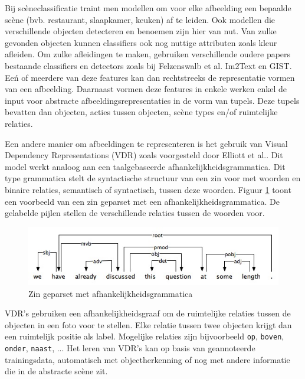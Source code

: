Bij sc\`eneclassificatie traint men modellen om voor elke afbeelding een bepaalde sc\`ene (bvb. restaurant, slaapkamer, keuken) af te leiden. Ook modellen die verschillende objecten detecteren en benoemen zijn hier van nut. Van zulke gevonden objecten kunnen classifiers ook nog nuttige attributen zoals kleur afleiden. Om zulke afleidingen te maken, gebruiken verschillende oudere papers bestaande classifiers en detectors zoals bij Felzenswalb et al.\cite{Felzenszwalb2008} Im2Text\cite{Ordonez2011} en GIST\cite{Oliva2006}. Ee\'n of meerdere van deze features kan dan rechtstreeks de representatie vormen van een afbeelding. Daarnaast vormen deze features in enkele werken \cite{Farhadi2010,Li2011,Mitchell2012,Yang2011} enkel de input voor abstracte afbeeldingsrepresentaties in de vorm van tupels. Deze tupels bevatten dan objecten, acties tussen objecten, sc\`ene types en/of ruimtelijke relaties.

Een andere manier om afbeeldingen te representeren is het gebruik van Visual Dependency Representations (VDR) zoals voorgesteld door Elliott et al.\cite{Elliott2013}. Dit model werkt analoog aan een taalgebaseerde afhankelijkheidsgrammatica. Dit type grammatica stelt de syntactische structuur van een zin voor met woorden en binaire relaties, semantisch of syntactisch, tussen deze woorden\cite{Jurafsky:2009:SLP:1214993}. Figuur \ref{fig:dep_grammar} toont een voorbeeld van een zin geparset met een afhankelijkheidsgrammatica. De gelabelde pijlen stellen de verschillende relaties tussen de woorden voor. 

\begin{figure}[tb]
      \centering
      \includegraphics[width=\linewidth]{Images/dependencygrammar.jpg}
      \caption{Zin geparset met afhankelijkheidsgrammatica\cite{GasserNotes}}
      \label{fig:dep_grammar}
  \end{figure}  

VDR's gebruiken een afhankelijkheidsgraaf om de ruimtelijke relaties tussen de objecten in een foto voor te stellen. Elke relatie tussen twee objecten krijgt dan een ruimtelijk positie als label. Mogelijke relaties zijn bijvoorbeeld \texttt{op}, \texttt{boven}, \texttt{onder}, \texttt{naast}, ... Het leren van VDR's kan op basis van geannoteerde trainingsdata, automatisch met objectherkenning\cite{Elliott2015} of nog met andere informatie die in de abstracte sc\`ene zit\cite{Gilberto2015}.  

